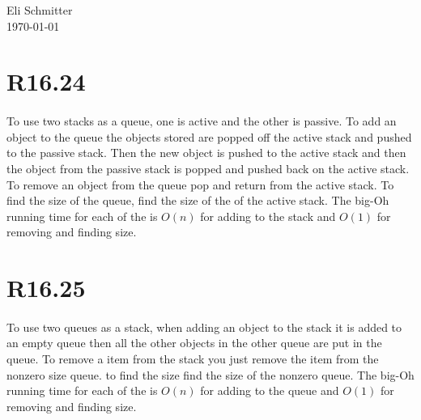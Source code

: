 \documentclass{article}
\begin{document}
\begin{flushleft}
  Eli Schmitter\\
  \today
\end{flushleft}
\section{R16.24}
\paragraph{}To use two stacks as a queue, one is active and the other is passive. To add an object to the queue the objects stored are popped off the active stack and pushed to the passive stack. Then the new object is pushed to the active stack and then the object from the passive stack is popped and pushed back on the active stack. To remove an object from the queue pop and return from the active stack. To find the size of the queue, find the size of the of the active stack. The big-Oh running
time for each of the is $O(n)$ for adding to the stack and $O(1)$ for removing and finding size.
\section{R16.25}
\paragraph{}To use two queues as a stack, when adding an object to the stack it is added to an empty queue then all the other objects in the other queue are put in the queue. To remove a item from the stack you just remove the item from the nonzero size queue. to find the size find the size of the nonzero queue.  The big-Oh running
time for each of the is $O(n)$ for adding to the queue and $O(1)$ for removing and finding size.
\end{document}
